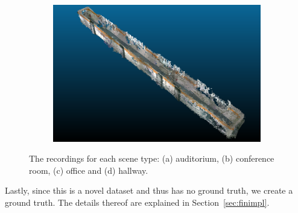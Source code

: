 \documentclass[main.tex]{subfiles}
\begin{document}
\begin{figure}[H]
\begin{subfigure}{0.5\textwidth}
        \caption[Dynamic Dataset office]{}
        \label{fig:fin425}
    \end{subfigure}
    \begin{subfigure}{0.5\textwidth}
        \centering
        \includegraphics[width=0.9\linewidth]{images/hallway.png}
        \caption[Dynamic Dataset office]{}
        \label{fig:finhw}
    \end{subfigure}
    \caption[Dynamic Datasets]{The recordings for each scene type: (a) auditorium, (b) conference room, (c) office and (d) hallway.}
    \label{fig:fin}
\end{figure}
Lastly, since this is a novel dataset and thus has no ground truth, we create a ground truth. The details thereof are explained in Section~\ref{sec:finimpl}.


\end{document}
